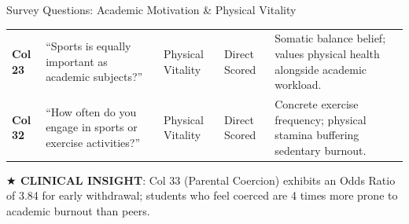 \documentclass{beamer}
\begin{document}
\begin{frame}[t]{Survey Questions: Academic Motivation \& Physical Vitality}
\begin{tcolorbox}[colback=white, colframe=BlueDeep, arc=1.2mm, boxrule=0.7pt, top=0.3mm, bottom=0.3mm, left=0.8mm, right=0.8mm]
\begin{tabularx}{\linewidth}{@{}p{0.7cm} p{4.2cm} p{1.6cm} p{1.6cm} X@{}}
      \midrule
      \rowcolor{CanvasBG} \textbf{Col 23} & ``Sports is equally important as academic subjects?'' & Physical Vitality & Direct Scored & Somatic balance belief; values physical health alongside academic workload. \\
      \rowcolor{BlueLight} \textbf{Col 32} & ``How often do you engage in sports or exercise activities?'' & Physical Vitality & Direct Scored & Concrete exercise frequency; physical stamina buffering sedentary burnout. \\
      \bottomrule
    \end{tabularx}
  \end{tcolorbox}
  \vspace{0.8mm}

  \begin{takeawaybanner}
    \fontsize{4.6pt}{5.6pt}\selectfont
    \textbf{\color{GoldPill}$\bigstar$ CLINICAL INSIGHT}: Col 33 (Parental Coercion) exhibits an Odds Ratio of 3.84 for early withdrawal; students who feel coerced are 4 times more prone to academic burnout than peers.
  \end{takeawaybanner}
\end{frame}
\end{document}
